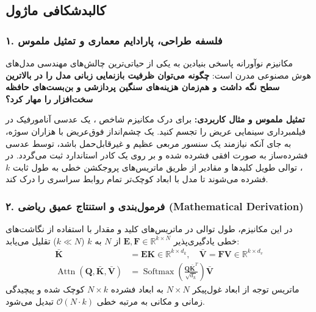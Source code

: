 \subsection{کالبدشکافی ماژول }

\subsubsection*{۱. فلسفه طراحی، پارادایم معماری و تمثیل ملموس}
مکانیزم نوآورانه  پاسخی بنیادین به یکی از حیاتی‌ترین چالش‌های مهندسی مدل‌های هوش مصنوعی مدرن است: \textbf{چگونه می‌توان ظرفیت بازنمایی زبانی مدل را در بالاترین سطح نگه داشت و هم‌زمان هزینه‌های سنگین پردازشی و بن‌بست‌های حافظه سخت‌افزار را مهار کرد؟}

\textbf{تمثیل ملموس و مثال کاربردی:}
برای درک مکانیزم شاخص ، یک عدسی آنامورفیک در فیلمبرداری سینمایی عریض را تجسم کنید. یک چشم‌انداز فوق‌عریض با هزاران سوژه، به جای آنکه نیازمند یک سنسور مربعی عظیم و غیرقابل‌حمل باشد، توسط عدسی فشرده‌ساز به صورت افقی فشرده شده و بر روی یک کادر استاندارد ثبت می‌گردد. در ، توالی طویل کلیدها و مقادیر از طریق ماتریس‌های پروجکشن خطی به طول ثابت $k$ فشرده می‌شوند تا مدل با ابعاد کوچک‌تر تمام روابط سراسری را درک کند.

\subsubsection*{۲. فرمول‌بندی و استنتاج عمیق ریاضی (Mathematical Derivation)}
در این مکانیزم، طول توالی در ماتریس‌های کلید و مقدار با استفاده از نگاشت‌های خطی یادگیری‌پذیر $\mathbf{E}, \mathbf{F} \in \mathbb{R}^{k \times N}$ از $N$ به $k$ ($k \ll N$) تقلیل می‌یابد:
\begin{align}
\bar{\mathbf{K}} &= \mathbf{E} \mathbf{K} \in \mathbb{R}^{k \times d_k}, \quad \bar{\mathbf{V}} = \mathbf{F} \mathbf{V} \in \mathbb{R}^{k \times d_v} \\
\operatorname{Attn}(\mathbf{Q}, \bar{\mathbf{K}}, \bar{\mathbf{V}}) &= \operatorname{Softmax}\left(\frac{\mathbf{Q} \bar{\mathbf{K}}^T}{\sqrt{d_k}}\right) \bar{\mathbf{V}}
\end{align}
ماتریس توجه از ابعاد غول‌پیکر $N \times N$ به ابعاد فشرده $N \times k$ کوچک شده و پیچیدگی زمانی و مکانی به مرتبه خطی $\mathcal{O}(N \cdot k)$ تبدیل می‌شود.

